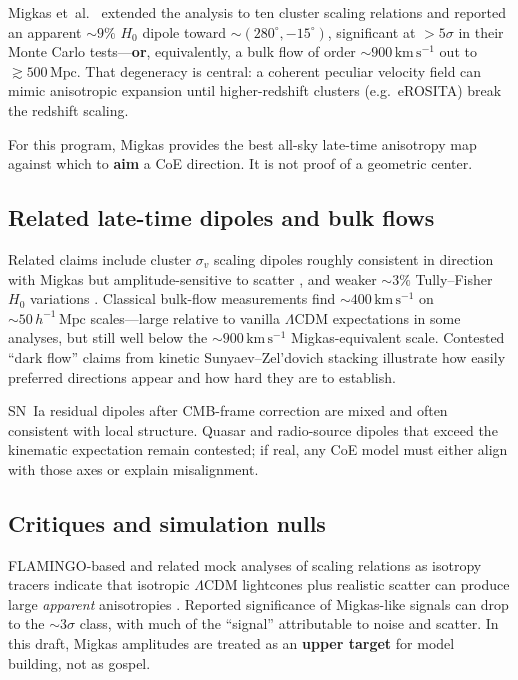 \documentclass[11pt,a4paper]{article}
\begin{document}
Migkas et~al.\ \cite{Migkas2021} extended the analysis to ten cluster scaling relations and reported an apparent \(\sim 9\%\) \(H_0\) dipole toward \(\sim(280^\circ,-15^\circ)\), significant at \(>5\sigma\) in their Monte Carlo tests---\textbf{or}, equivalently, a bulk flow of order \(\sim 900\,\mathrm{km\,s^{-1}}\) out to \(\gtrsim 500\,\mathrm{Mpc}\). That degeneracy is central: a coherent peculiar velocity field can mimic anisotropic expansion until higher-redshift clusters (e.g.\ eROSITA) break the redshift scaling.

For this program, Migkas provides the best all-sky late-time anisotropy map against which to \textbf{aim} a CoE direction. It is not proof of a geometric center.

\subsection{Related late-time dipoles and bulk flows}

Related claims include cluster \(\sigma_v\) scaling dipoles roughly consistent in direction with Migkas but amplitude-sensitive to scatter \cite{Pandya2024}, and weaker \(\sim 3\%\) Tully--Fisher \(H_0\) variations \cite{Boubel2025}. Classical bulk-flow measurements \cite{Watkins2009} find \(\sim 400\,\mathrm{km\,s^{-1}}\) on \(\sim 50\,h^{-1}\,\mathrm{Mpc}\) scales---large relative to vanilla \(\Lambda\)CDM expectations in some analyses, but still well below the \(\sim 900\,\mathrm{km\,s^{-1}}\) Migkas-equivalent scale. Contested ``dark flow'' claims from kinetic Sunyaev--Zel'dovich stacking \cite{Kashlinsky2008} illustrate how easily preferred directions appear and how hard they are to establish.

SN~Ia residual dipoles after CMB-frame correction are mixed and often consistent with local structure. Quasar and radio-source dipoles that exceed the kinematic expectation remain contested; if real, any CoE model must either align with those axes or explain misalignment.

\subsection{Critiques and simulation nulls}

FLAMINGO-based and related mock analyses of scaling relations as isotropy tracers indicate that isotropic \(\Lambda\)CDM lightcones plus realistic scatter can produce large \emph{apparent} anisotropies \cite{FLAMINGO2025}. Reported significance of Migkas-like signals can drop to the \(\sim 3\sigma\) class, with much of the ``signal'' attributable to noise and scatter. In this draft, Migkas amplitudes are treated as an \textbf{upper target} for model building, not as gospel.
\end{document}
